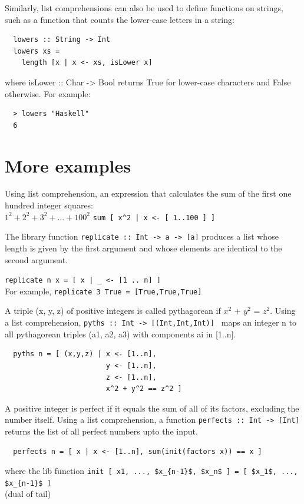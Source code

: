 \documentclass[tikz,border=10pt]{project_plan}
\begin{document}
Similarly, list comprehensions can also be used to define
functions on strings, such as a function that counts the
lower-case letters in a string:
\begin{lstlisting}
  lowers :: String -> Int
  lowers xs =
    length [x | x <- xs, isLower x]
\end{lstlisting}
where isLower :: Char -> Bool returns True for lower-case
characters and False otherwise. For example:
\begin{lstlisting}
  > lowers "Haskell"
  6
\end{lstlisting}


\section{More examples}

Using list comprehension, an expression that calculates the sum of
the first one hundred integer squares:\\
$1^2 + 2^2 + 3^2 + ... + 100^2$
\lstinline?sum [ x^2 | x <- [ 1..100 ] ] ?

The library function \lstinline|replicate :: Int -> a -> [a]|
produces a list whose length is given by the first argument and whose
elements are identical to the second argument.

\lstinline?replicate n x = [ x | _ <- [1 .. n] ]?\\
For example, \lstinline|replicate 3 True = [True,True,True]|


A triple (x, y, z) of positive integers is called
pythagorean if $x^2$ + $y^2$ = $z^2$. Using a list
comprehension, \lstinline|pyths :: Int -> [(Int,Int,Int)] |
maps an integer n to all pythagorean triples
(a1, a2, a3) with components ai in [1..n].
\begin{lstlisting}
  pyths n = [ (x,y,z) | x <- [1..n],
                        y <- [1..n],
                        z <- [1..n],
                        x^2 + y^2 == z^2 ]
\end{lstlisting}

A positive integer is perfect if it equals the sum of all of its
factors, excluding the number itself.
Using a list comprehension,  a function
\lstinline|perfects :: Int -> [Int]| returns the list of all perfect numbers upto the input.
\begin{lstlisting}
  perfects n = [ x | x <- [1..n], sum(init(factors x)) == x ]
\end{lstlisting}
where the lib function \lstinline[mathescape]|init [ x1, ..., $x_{n-1}$, $x_n$ ] = [ $x_1$, ..., $x_{n-1}$ ]|\\
(dual of tail)
\end{document}
